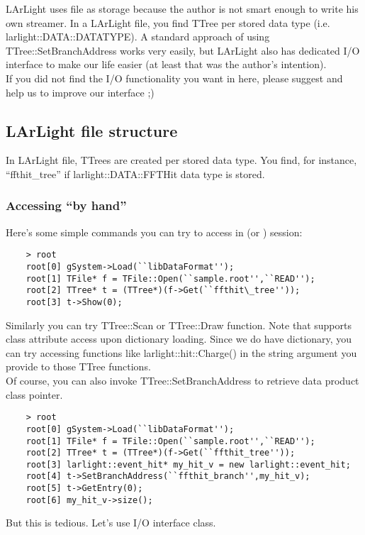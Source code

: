 
LArLight uses \ROOT file as storage because the author is not smart enough to write his own streamer.
In a LArLight \ROOT file, you find {\ttfamily TTree} per stored data type (i.e. {\ttfamily larlight::DATA::DATATYPE}).
A standard approach of using {\ttfamily TTree::SetBranchAddress} works very easily, but LArLight also has dedicated I/O interface to make our life easier (at least that was the author's intention).\\

If you did not find the I/O functionality you want in here, please suggest and help us to improve our interface ;)

\subsection{LArLight \ROOT file structure}
In LArLight \ROOT file, TTrees are created per stored data type. 
You find, for instance, ``ffthit\_tree'' if  {\ttfamily larlight::DATA::FFTHit} data type is stored.

\subsubsection{Accessing ``by hand''}
Here's some simple commands you can try to access in \CINT (or \PyROOT) session:
\begin{lstlisting}
    > root
    root[0] gSystem->Load(``libDataFormat'');
    root[1] TFile* f = TFile::Open(``sample.root'',``READ'');
    root[2] TTree* t = (TTree*)(f->Get(``ffthit\_tree''));
    root[3] t->Show(0);
\end{lstlisting}
Similarly you can try {\ttfamily TTree::Scan} or {\ttfamily TTree::Draw} function.
Note that \ROOT supports class attribute access upon \CINT dictionary loading.
Since we do have \CINT dictionary, you can try accessing functions like {\ttfamily larlight::hit::Charge()} in the string argument you provide to those {\ttfamily TTree} functions.\\

Of course, you can also invoke {\ttfamily TTree::SetBranchAddress} to retrieve data product class pointer.
\begin{lstlisting}
    > root
    root[0] gSystem->Load(``libDataFormat'');
    root[1] TFile* f = TFile::Open(``sample.root'',``READ'');
    root[2] TTree* t = (TTree*)(f->Get(``ffthit_tree''));
    root[3] larlight::event_hit* my_hit_v = new larlight::event_hit;
    root[4] t->SetBranchAddress(``ffthit_branch'',my_hit_v);
    root[5] t->GetEntry(0);
    root[6] my_hit_v->size();
\end{lstlisting}
But this is tedious. Let's use I/O interface class.

